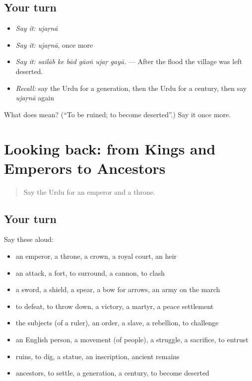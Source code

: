 \subsection*{Your turn}
\begin{itemize}
\raggedright
  \item \emph{Say it:} \emph{ujaṛnā}
  \item \emph{Say it:} \emph{ujaṛnā}, once more
  \item \emph{Say it:} \emph{sailāb ke bād gāoṅ ujaṛ gayā.} — After the flood the village was left deserted.
  \item \emph{Recall:} say the Urdu for a generation, then the Urdu for a century, then say \emph{ujaṛnā} again
\end{itemize}

\begin{tcolorbox}[breakable,colback=teal!4,colframe=teal!35!black,title={Before you move on}]
What does  mean? (\textquotedblleft{}To be ruined; to become deserted\textquotedblright{}.) Say it once more.
\end{tcolorbox}
\section[(dialogue)]{Looking back: from Kings and Emperors to Ancestors}

\label{lesson:UR-R315-review-308-315}



\begin{quote}
Say the Urdu for an emperor and a throne.
\end{quote}

\subsection*{Your turn}
Say these aloud:

\begin{itemize}
\raggedright
  \item an emperor, a throne, a crown, a royal court, an heir
  \item an attack, a fort, to surround, a cannon, to clash
  \item a sword, a shield, a spear, a bow for arrows, an army on the march
  \item to defeat, to throw down, a victory, a martyr, a peace settlement
  \item the subjects (of a ruler), an order, a slave, a rebellion, to challenge
  \item an English person, a movement (of people), a struggle, a sacrifice, to entrust
  \item ruins, to dig, a statue, an inscription, ancient remains
  \item ancestors, to settle, a generation, a century, to become deserted
\end{itemize}

